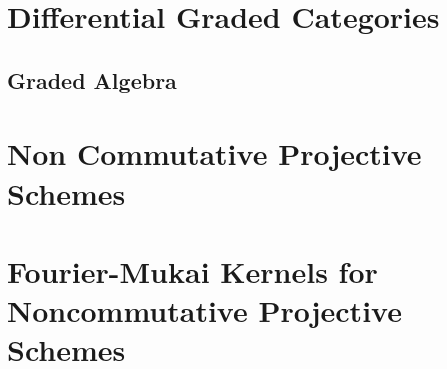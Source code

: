 \documentclass[10pt,draft]{book}
\begin{document}
\chapter{Differential Graded Categories}

\section{Graded Algebra}

\chapter{Non Commutative Projective Schemes}

\chapter{Fourier-Mukai Kernels for Noncommutative Projective Schemes}


%
%
\end{document}

